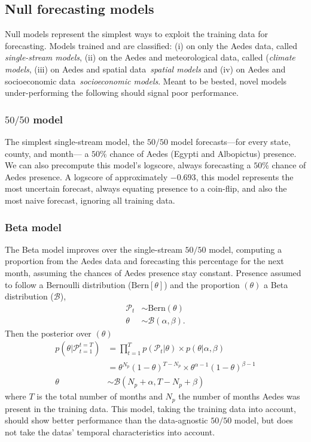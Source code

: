 \documentclass[onecolumn,secnumarabic,amssymb, nobibnotes, aps, pr,superscriptaddress]{revtex4-1}
\def\l{\left}
\def\r{\right}
\begin{document}
\subsection{Null forecasting models}

Null models represent the simplest ways to exploit the training data for forecasting.
Models trained and are classified: (i) on only the Aedes data, called \textit{single-stream models}, (ii) on the Aedes and meteorological data, called (\textit{climate models}, (iii) on Aedes and spatial data~\textit{spatial models} and (iv) on Aedes and socioeconomic data~\textit{socioeconomic models}.
Meant to be bested, novel models under-performing the following should signal poor performance.

\subsubsection{$50/50$ model}
The simplest single-stream model, the $50/50$ model forecasts---for every state, county, and month--- a $50\%$ chance of Aedes (Egypti and Albopictus) presence.
We can also precompute this model's logscore, always forecasting a $50\%$ chance of Aedes presence.
A logscore of approximately $-0.693$, this model represents the most uncertain forecast, always equating presence to a coin-flip, and also the most naive forecast, ignoring all training data.

\subsubsection{Beta model}
The Beta model improves over the single-stream $50/50$ model, computing a proportion from the Aedes data and forecasting this percentage for the next month, assuming the chances of Aedes presence stay constant.
Presence assumed to follow a Bernoulli distribution ($\text{Bern}[\theta]$) and the proportion $(\theta)$ a Beta distribution ($\mathcal{B}$),
\begin{align*}
  \mathcal{P}_{t} &\sim \text{Bern}\l(\theta\r)\\
  \theta & \sim \mathcal{B}(\alpha,\beta).
\end{align*}
Then the posterior over $(\theta)$
\begin{align*}
   p(\theta | \mathcal{P}_{t=1}^{t=T}) &= \prod_{t=1}^{T} p( \mathcal{P}_{t} | \theta) \times p(\theta| \alpha,\beta)\\
                                    &= \theta^{N_{p}} \l(1-\theta\r)^{T-N_{p}} \times \theta^{\alpha-1} \l(1-\theta\r)^{\beta-1}\\
   \theta &\sim \mathcal{B}\l( N_{p} + \alpha, T-N_{p} + \beta \r)
\end{align*}
where $T$ is the total number of months and $N_{p}$ the number of months Aedes was present in the training data.  
This model, taking the training data into account, should show better performance than the data-agnostic $50/50$ model, but does not take the datas' temporal characteristics into account.
\end{document}
